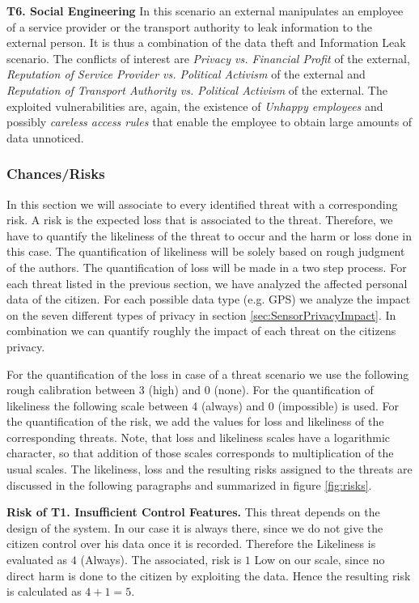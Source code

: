 \documentclass[runningheads,a4paper]{llncs}
\begin{document}
\textbf{T6. Social Engineering}
In this scenario an external manipulates an employee of a service
provider or the transport authority to leak information to the external
person.  It is thus a combination of the data theft and Information Leak
scenario.
The conflicts of interest are \textit{Privacy vs. Financial Profit} of
the external, \textit{Reputation of Service Provider vs. Political
  Activism} of the external and \textit{Reputation of Transport Authority
  vs. Political Activism} of the external.  The exploited
vulnerabilities are, again, the existence of \textit{Unhappy
  employees} and possibly \textit{careless access rules} that enable the
employee to obtain large amounts of data unnoticed.

\subsubsection{Chances/Risks}

In this section we will associate to every identified threat with a corresponding risk. A risk is the expected loss that is associated to the threat.
Therefore, we have to quantify the likeliness of the threat to occur and the harm or loss done in this case.
The quantification of likeliness will be solely based on rough judgment of the authors.
The quantification of loss will be made in a two step process.
For each threat listed in the previous section, we have analyzed the affected personal data of the citizen.
For each possible data type (e.g. GPS) we analyze the impact on the seven different types of privacy in section \ref{sec:SensorPrivacyImpact}.
In combination we can quantify roughly the impact of each threat on the citizens privacy. 

For the quantification of the loss in case of a threat scenario we use the following rough calibration between 3 (high) and 0 (none). For the quantification of likeliness the following scale between 4 (always) and 0 (impossible) is used. For the quantification of the risk, we add the values for loss and likeliness of the corresponding threats. Note, that loss and
likeliness scales have a logarithmic character, so that addition
of those scales corresponds to multiplication of the usual scales. The likeliness, loss and the resulting risks assigned to the threats
are discussed in the following paragraphs and summarized in figure
\ref{fig:risks}.

\textbf{Risk of T1. Insufficient Control Features.}  This threat depends on the design of the system. In our case it is always there,
since we do not give the citizen control over his data once it is
recorded. Therefore the Likeliness is evaluated as $4$ (Always).  The
associated, risk is $1$ Low on our scale, since no direct harm is done to
the citizen by exploiting the data. Hence the resulting risk is calculated as $4+1 = 5$.
\end{document}

